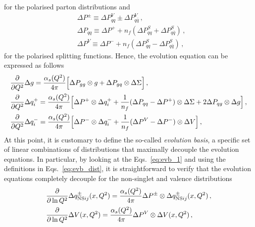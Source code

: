 for the polarised parton distributions and
\begin{equation}
  \begin{split}
    & \Delta P^{\pm} \equiv \Delta P_{qq}^{V} \pm \Delta P_{q \bar{q}}^{V} \,,\\
    & \Delta P_{qq} \equiv \Delta P^{+} + n_{f} (\Delta P_{qq}^{S} + \Delta P_{q\bar{q}}^{S} )  \,,\\
    & \Delta P^{V} \equiv \Delta P^{-} + n_{f} (\Delta P_{qq}^{S} - \Delta P_{q \bar{q}}^{S}) \,,
  \end{split}
\end{equation}
for the polarised splitting functions. Hence, the evolution equation can be expressed as follows
\begin{equation}
  \begin{split}
    & \frac{\partial}{\partial Q^2} \Delta g  = \frac{\alpha_{s}(Q^2)}{4 \pi} \Bigl[ \Delta P_{gg} \otimes g + \Delta P_{gq} \otimes \Delta \Sigma \Bigr] \,,\\
    & \frac{\partial}{\partial Q^2} \Delta q^{+}_{i} = \frac{\alpha_{s}(Q^2)}{4 \pi} \Bigl[ \Delta P^{+} \otimes \Delta q_{i}^{+} + \frac{1}{n_f} (\Delta P_{qq} - \Delta P^{+}) \otimes \Delta \Sigma + 2 \Delta P_{qg} \otimes \Delta g \Bigr] \,,\\
    & \frac{\partial}{\partial Q^2} \Delta q^{-}_{i} = \frac{\alpha_{s}(Q^2)}{4 \pi} \Bigl[ \Delta P^{-} \otimes \Delta q_{i}^{-} + \frac{1}{n_f} (\Delta P^{V} - \Delta P^{-}) \otimes \Delta V \Bigr] \,,\\
  \end{split}
  \label{eq:evb_1}
\end{equation}
At this point, it is customary to define the so-called \textit{evolution basis}, a specific set of linear combinations of distributions that maximally decouple the evolution equations. In particular, by looking at the Eqs.~\eqref{eq:evb_1} and using the definitions in Eqs.~\eqref{eq:evb_dist}, it is straightforward to verify that the evolution equations completely decouple for the non-singlet and valence distributions
\begin{equation}
  \begin{split}
    & \frac{\partial}{\partial \ln Q^2}\Delta q_{\textrm{NS}ij}^{\pm} (x,Q^2) = \frac{\alpha_s(Q^2)}{4\pi} \Delta P^{\pm} \otimes \Delta q_{{\textrm{NS}ij}}^{\pm} (x,Q^2) \,, \\
    & \frac{\partial}{\partial \ln Q^2}\Delta V (x,Q^2) = \frac{\alpha_s(Q^2)}{4\pi} \Delta P^{V} \otimes \Delta V (x,Q^2)\,,
  \end{split}
\end{equation}
